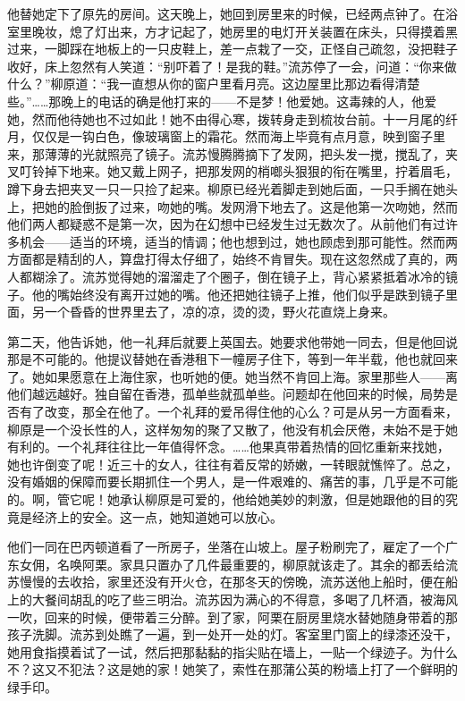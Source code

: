 \par 他替她定下了原先的房间。这天晚上，她回到房里来的时候，已经两点钟了。在浴室里晚妆，熄了灯出来，方才记起了，她房里的电灯开关装置在床头，只得摸着黑过来，一脚踩在地板上的一只皮鞋上，差一点栽了一交，正怪自己疏忽，没把鞋子收好，床上忽然有人笑道：“别吓着了！是我的鞋。”流苏停了一会，问道：“你来做什么？”柳原道：“我一直想从你的窗户里看月亮。这边屋里比那边看得清楚些。”……那晚上的电话的确是他打来的——不是梦！他爱她。这毒辣的人，他爱她，然而他待她也不过如此！她不由得心寒，拨转身走到梳妆台前。十一月尾的纤月，仅仅是一钩白色，像玻璃窗上的霜花。然而海上毕竟有点月意，映到窗子里来，那薄薄的光就照亮了镜子。流苏慢腾腾摘下了发网，把头发一搅，搅乱了，夹叉叮铃掉下地来。她又戴上网子，把那发网的梢啷头狠狠的衔在嘴里，拧着眉毛，蹲下身去把夹叉一只一只捡了起来。柳原已经光着脚走到她后面，一只手搁在她头上，把她的脸倒扳了过来，吻她的嘴。发网滑下地去了。这是他第一次吻她，然而他们两人都疑惑不是第一次，因为在幻想中已经发生过无数次了。从前他们有过许多机会——适当的环境，适当的情调；他也想到过，她也顾虑到那可能性。然而两方面都是精刮的人，算盘打得太仔细了，始终不肯冒失。现在这忽然成了真的，两人都糊涂了。流苏觉得她的溜溜走了个圈子，倒在镜子上，背心紧紧抵着冰冷的镜子。他的嘴始终没有离开过她的嘴。他还把她往镜子上推，他们似乎是跌到镜子里面，另一个昏昏的世界里去了，凉的凉，烫的烫，野火花直烧上身来。
\par 第二天，他告诉她，他一礼拜后就要上英国去。她要求他带她一同去，但是他回说那是不可能的。他提议替她在香港租下一幢房子住下，等到一年半载，他也就回来了。她如果愿意在上海住家，也听她的便。她当然不肯回上海。家里那些人——离他们越远越好。独自留在香港，孤单些就孤单些。问题却在他回来的时候，局势是否有了改变，那全在他了。一个礼拜的爱吊得住他的心么？可是从另一方面看来，柳原是一个没长性的人，这样匆匆的聚了又散了，他没有机会厌倦，未始不是于她有利的。一个礼拜往往比一年值得怀念。……他果真带着热情的回忆重新来找她，她也许倒变了呢！近三十的女人，往往有着反常的娇嫩，一转眼就憔悴了。总之，没有婚姻的保障而要长期抓住一个男人，是一件艰难的、痛苦的事，几乎是不可能的。啊，管它呢！她承认柳原是可爱的，他给她美妙的刺激，但是她跟他的目的究竟是经济上的安全。这一点，她知道她可以放心。
\par 他们一同在巴丙顿道看了一所房子，坐落在山坡上。屋子粉刷完了，雇定了一个广东女佣，名唤阿栗。家具只置办了几件最重要的，柳原就该走了。其余的都丢给流苏慢慢的去收拾，家里还没有开火仓，在那冬天的傍晚，流苏送他上船时，便在船上的大餐间胡乱的吃了些三明治。流苏因为满心的不得意，多喝了几杯酒，被海风一吹，回来的时候，便带着三分醉。到了家，阿栗在厨房里烧水替她随身带着的那孩子洗脚。流苏到处瞧了一遍，到一处开一处的灯。客室里门窗上的绿漆还没干，她用食指摸着试了一试，然后把那黏黏的指尖贴在墙上，一贴一个绿迹子。为什么不？这又不犯法？这是她的家！她笑了，索性在那蒲公英的粉墙上打了一个鲜明的绿手印。
